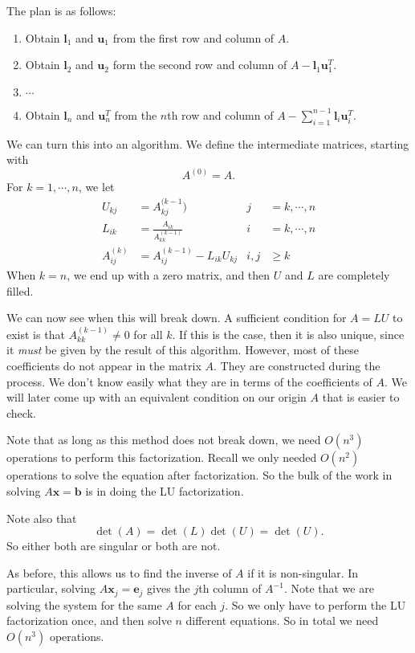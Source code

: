 \documentclass[a4paper]{article}
\begin{document}
The plan is as follows:
\begin{enumerate}
  \item Obtain $\mathbf{l}_1$ and $\mathbf{u}_1$ from the first row and column of $A$.
  \item Obtain $\mathbf{l}_2$ and $\mathbf{u}_2$ form the second row and column of $A - \mathbf{l}_1 \mathbf{u}_1^T$.
  \item $\cdots$
  \item Obtain $\mathbf{l}_n$ and $\mathbf{u}_n^T$ from the $n$th row and column of $A - \sum_{i = 1}^{n - 1} \mathbf{l}_i \mathbf{u}_i^T$.
\end{enumerate}
We can turn this into an algorithm. We define the intermediate matrices, starting with
\[
  A^{(0)} = A.
\]
For $k = 1, \cdots, n$, we let
\begin{align*}
  U_{kj} &= A_{kj}^{(k - 1}) & j &=k, \cdots, n\\
  L_{ik} &= \frac{A_{ik}}{A_{kk}^{(k - 1)}} & i &= k, \cdots, n\\
  A_{ij}^{(k)} &= A_{ij}^{(k - 1)} - L_{ik} U_{kj} & i, j &\geq k
\end{align*}
When $k = n$, we end up with a zero matrix, and then $U$ and $L$ are completely filled.

We can now see when this will break down. A sufficient condition for $A = LU$ to exist is that $A_{kk}^{(k - 1)} \not= 0$ for all $k$. If this is the case, then it is also unique, since it \emph{must} be given by the result of this algorithm. However, most of these coefficients do not appear in the matrix $A$. They are constructed during the process. We don't know easily what they are in terms of the coefficients of $A$. We will later come up with an equivalent condition on our origin $A$ that is easier to check.

Note that as long as this method does not break down, we need $O(n^3)$ operations to perform this factorization. Recall we only needed $O(n^2)$ operations to solve the equation after factorization. So the bulk of the work in solving $A\mathbf{x} = \mathbf{b}$ is in doing the LU factorization.

Note also that
\[
  \det (A) = \det(L) \det (U) = \det(U).
\]
So either both are singular or both are not.

As before, this allows us to find the inverse of $A$ if it is non-singular. In particular, solving $A\mathbf{x}_j = \mathbf{e}_j$ gives the $j$th column of $A^{-1}$. Note that we are solving the system for the same $A$ for each $j$. So we only have to perform the LU factorization once, and then solve $n$ different equations. So in total we need $O(n^3)$ operations.
\end{document}
